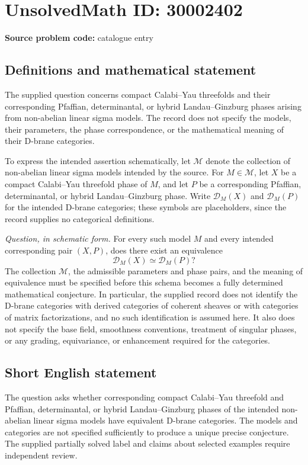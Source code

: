 \documentclass[11pt]{article}
\begin{document}
\section*{UnsolvedMath ID: 30002402}
\textbf{Source problem code:} catalogue entry
\subsection{Definitions and mathematical statement}
The supplied question concerns compact Calabi--Yau threefolds and their corresponding Pfaffian, determinantal, or hybrid Landau--Ginzburg phases arising from non-abelian linear sigma models. The record does not specify the models, their parameters, the phase correspondence, or the mathematical meaning of their D-brane categories.

To express the intended assertion schematically, let \(\mathcal M\) denote the collection of non-abelian linear sigma models intended by the source. For \(M\in\mathcal M\), let \(X\) be a compact Calabi--Yau threefold phase of \(M\), and let \(P\) be a corresponding Pfaffian, determinantal, or hybrid Landau--Ginzburg phase. Write \(\mathcal D_M(X)\) and \(\mathcal D_M(P)\) for the intended D-brane categories; these symbols are placeholders, since the record supplies no categorical definitions.

\emph{Question, in schematic form.} For every such model \(M\) and every intended corresponding pair \((X,P)\), does there exist an equivalence
\[
\mathcal D_M(X)\simeq\mathcal D_M(P)?
\]
The collection \(\mathcal M\), the admissible parameters and phase pairs, and the meaning of equivalence must be specified before this schema becomes a fully determined mathematical conjecture. In particular, the supplied record does not identify the D-brane categories with derived categories of coherent sheaves or with categories of matrix factorizations, and no such identification is assumed here. It also does not specify the base field, smoothness conventions, treatment of singular phases, or any grading, equivariance, or enhancement required for the categories.
\subsection{Short English statement}
The question asks whether corresponding compact Calabi--Yau threefold and Pfaffian, determinantal, or hybrid Landau--Ginzburg phases of the intended non-abelian linear sigma models have equivalent D-brane categories. The models and categories are not specified sufficiently to produce a unique precise conjecture. The supplied partially solved label and claims about selected examples require independent review.
\end{document}

